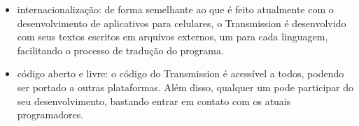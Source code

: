 
\begin{itemize}
    \item internacionalização: de forma semelhante ao que é feito atualmente com
        o desenvolvimento de aplicativos para celulares, o Transmission é desenvolvido
        com seus textos escritos em arquivos externos, um para cada linguagem,
        facilitando o processo de tradução do programa.

    \item código aberto e livre: o código do Transmission é acessível a todos, podendo
        ser portado a outras plataformas. Além disso, qualquer um pode participar do seu
        desenvolvimento, bastando entrar em contato com os atuais programadores.
\end{itemize}